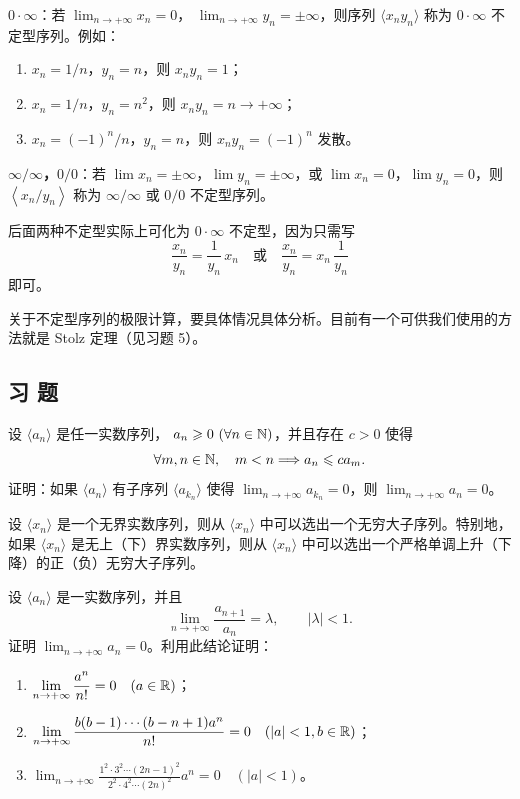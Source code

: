 \textbf{\(0\cdot\infty\)}：若
\(\lim_{n\to+\infty}x_n=0\)，
\(\lim_{n\to+\infty}y_n=\pm\infty\)，则序列
\(\langle x_ny_n\rangle\) 称为 \(0\cdot\infty\) 不定型序列。例如：
\begin{enumerate}[label=\roman*)]
  \item \(x_n=1/n\)，\(y_n=n\)，则 \(x_ny_n=1\)；
  \item \(x_n=1/n\)，\(y_n=n^2\)，则 \(x_ny_n=n\to+\infty\)；
  \item \(x_n=(-1)^n/n\)，\(y_n=n\)，则 \(x_ny_n=(-1)^n\) 发散。
\end{enumerate}

\textbf{\(\infty/\infty\)，\(0/0\)}：若
\(\lim x_n=\pm\infty\)，\(\lim y_n=\pm\infty\)，或
\(\lim x_n=0\)，\(\lim y_n=0\)，则
\(\left\langle x_n/y_n\right\rangle\) 称为
\(\infty/\infty\) 或 \(0/0\) 不定型序列。

后面两种不定型实际上可化为 \(0\cdot\infty\) 不定型，因为只需写
\[
\frac{x_n}{y_n}=\frac1{y_n}\,x_n
\quad\text{或}\quad
\frac{x_n}{y_n}=x_n\,\frac1{y_n}
\]
即可。

关于不定型序列的极限计算，要具体情况具体分析。目前有一个可供我们使用的方法就是 Stolz 定理（见习题 5）。

\subsection*{习 题}

\begin{exercise}
  \item 设 \(\langle a_n\rangle\) 是任一实数序列，
  \(a_n\geqslant0\ (\forall n\in\mathbb{N})\)，并且存在 \(c>0\) 使得
  \[
  \forall m,n\in\mathbb{N},\quad m<n\Longrightarrow a_n\leqslant ca_m.
  \]
  证明：如果 \(\langle a_n\rangle\) 有子序列
  \(\langle a_{k_n}\rangle\) 使得
  \(\lim_{n\to+\infty}a_{k_n}=0\)，则
  \(\lim_{n\to+\infty}a_n=0\)。
\end{exercise}

\begin{exercise}
  \item 设 \(\langle x_n\rangle\) 是一个无界实数序列，则从
  \(\langle x_n\rangle\) 中可以选出一个无穷大子序列。特别地，如果
  \(\langle x_n\rangle\) 是无上（下）界实数序列，则从
  \(\langle x_n\rangle\) 中可以选出一个严格单调上升（下降）的正（负）无穷大子序列。
\end{exercise}

\begin{exercise}
  \item 设 \(\langle a_n\rangle\) 是一实数序列，并且
  \[
  \lim_{n\to+\infty}\frac{a_{n+1}}{a_n}=\lambda,\qquad |\lambda|<1.
  \]
  证明 \(\lim_{n\to+\infty}a_n=0\)。利用此结论证明：
  \begin{enumerate}[label=\arabic*)]
    \item \(\displaystyle\lim_{n\to+\infty}\frac{a^n}{n!}=0\quad(a\in\mathbb{R})\)；
    \item \(\displaystyle\lim_{n\to+\infty}\frac{b(b-1)\cdots(b-n+1)a^n}{n!}=0\quad(|a|<1, b\in\mathbb{R})\)；
    \item \(\displaystyle\lim_{n\to+\infty}\frac{1^2\cdot3^2\cdots(2n-1)^2}{2^2\cdot4^2\cdots(2n)^2}a^n=0\quad(|a|<1)\)。
  \end{enumerate}
\end{exercise}

